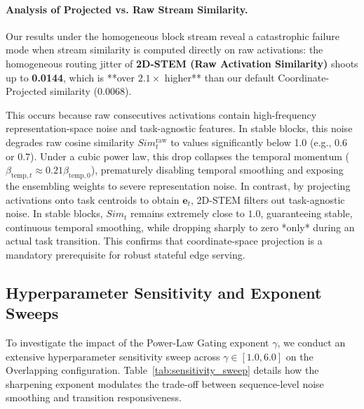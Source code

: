 \paragraph{Analysis of Projected vs. Raw Stream Similarity.}
Our results under the homogeneous block stream reveal a catastrophic failure mode when stream similarity is computed directly on raw activations: the homogeneous routing jitter of \textbf{2D-STEM (Raw Activation Similarity)} shoots up to \textbf{0.0144}, which is **over $2.1\times$ higher** than our default Coordinate-Projected similarity ($0.0068$). 

This occurs because raw consecutives activations contain high-frequency representation-space noise and task-agnostic features. In stable blocks, this noise degrades raw cosine similarity $Sim_t^{\text{raw}}$ to values significantly below 1.0 (e.g., $0.6$ or $0.7$). Under a cubic power law, this drop collapses the temporal momentum ($\beta_{\text{temp}, t} \approx 0.21\beta_{\text{temp},0}$), prematurely disabling temporal smoothing and exposing the ensembling weights to severe representation noise. In contrast, by projecting activations onto task centroids to obtain $\mathbf{e}_t$, 2D-STEM filters out task-agnostic noise. In stable blocks, $Sim_t$ remains extremely close to $1.0$, guaranteeing stable, continuous temporal smoothing, while dropping sharply to zero *only* during an actual task transition. This confirms that coordinate-space projection is a mandatory prerequisite for robust stateful edge serving.

\subsection{Hyperparameter Sensitivity and Exponent Sweeps}
To investigate the impact of the Power-Law Gating exponent $\gamma$, we conduct an extensive hyperparameter sensitivity sweep across $\gamma \in [1.0, 6.0]$ on the Overlapping configuration. Table~\ref{tab:sensitivity_sweep} details how the sharpening exponent modulates the trade-off between sequence-level noise smoothing and transition responsiveness.

